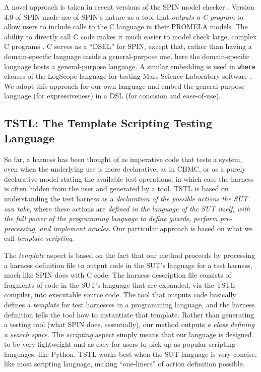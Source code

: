 A novel approach is taken in recent versions of the SPIN model checker
\cite{SPIN}.  Version 4.0 of SPIN \cite{ModelDriven} made use of
SPIN's nature as a tool that \emph{outputs a C program} to allow users
to include calls to the C language in their PROMELA models.  The
ability to directly call C code makes it much easier to model check
large, complex C programs \cite{AMAI,ModelCode}.  C serves as a
``DSEL'' for SPIN, except that, rather than having a domain-specific
language inside a general-purpose one, here the domain-specific
language hosts a general-purpose language.  A similar embedding is
used in {\tt where} clauses of the LogScope language for testing Mars
Science Laboratory software \cite{scriptstospecs}.  We adopt this
approach for our own language and embed the general-purpose language (for expressiveness) in a
DSL (for concision and ease-of-use).

\subsection{TSTL: The Template Scripting Testing Language}

So far, a harness has been thought of as imperative
code that tests a system, even when the underlying use is more
declarative, as in CBMC, or as a purely declarative model stating the
available test operations, in which case the harness is often hidden
from the user and generated by a tool.  TSTL is based on understanding
the test harness as a \emph{declaration of the possible actions
the SUT can take}, where these actions are \emph{defined in the
language of the SUT itself, with the full power of the programming
language to define guards, perform pre-processing, and implement
oracles}.  Our particular approach is based
on what we call \emph{template scripting}.

The \emph{template} aspect is based on the fact that our method
proceeds by processing a harness definition file to output code in the
SUT's language for a test harness, much like SPIN does with C code.  The harness
description file consists of fragments of code in the SUT's language
that are expanded, via the TSTL compiler, into executable source code.
The tool that outputs code basically defines a \emph{template} for
test harnesses in a programming language, and the harness definition
tells the tool how to instantiate that template.  Rather
than generating a testing tool (what SPIN does, essentially), our method outputs \emph{a class
defining a search space}.  The \emph{scripting} aspect simply means
that our language is designed to be very lightweight and as easy for
users to pick up as popular scripting languages, like Python.  TSTL
works best when the SUT language is very
concise, like most scripting language, making ``one-liners'' of action definition possible.

